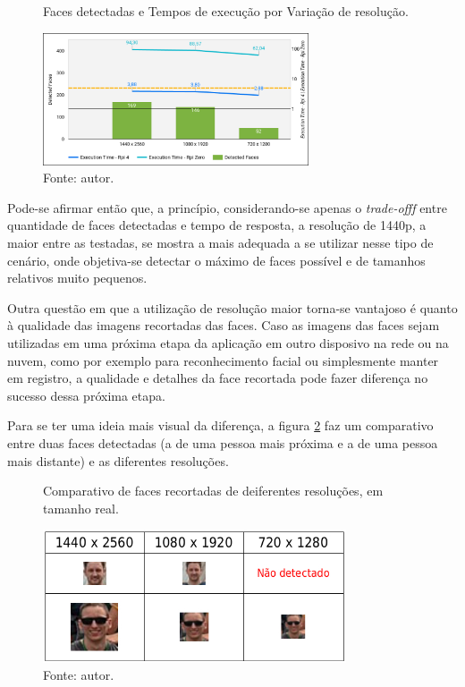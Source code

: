 \begin{figure}
    \centering
    \caption[Faces detectadas e Tempos de execução por Variação de resolução.]{Faces detectadas e Tempos de execução por Variação de resolução.}
    \includegraphics[width=0.7\textwidth]{Cap4_Experimentos_Realizados/Figures/cena1_graficos_variacao_resolucao.jpg}
    \caption*{Fonte: autor.}
    \label{fig:cena1_graficos_variacao_resolucao}
\end{figure}

Pode-se afirmar então que, a princípio, considerando-se apenas o \emph{trade-offf} entre quantidade de faces detectadas e tempo de resposta, a resolução de 1440p, a maior entre as  testadas, se mostra a mais adequada a se utilizar nesse tipo de cenário, onde objetiva-se detectar o máximo de faces possível e de tamanhos relativos muito pequenos.

Outra questão em que a utilização de resolução maior torna-se vantajoso é quanto à qualidade das imagens recortadas das faces. Caso as imagens das faces sejam utilizadas em uma próxima etapa da aplicação em outro disposivo na rede ou na nuvem, como por exemplo para reconhecimento facial ou simplesmente manter em registro, a qualidade e detalhes da face recortada pode fazer diferença no sucesso dessa próxima etapa.

Para se ter uma ideia mais visual da diferença, a figura \ref{fig:cena1_comparativo_qualidade_faces} faz um comparativo entre duas faces detectadas (a de uma pessoa mais próxima e a de uma pessoa mais distante) e as diferentes resoluções.

\begin{figure}
    \centering
    \caption[Comparativo de faces recortadas de deiferentes resoluções, em tamanho real.]{Comparativo de faces recortadas de deiferentes resoluções, em tamanho real.}
    \includegraphics[width=0.8\textwidth]{Cap4_Experimentos_Realizados/Figures/cena1_comparativo_qualidade_faces_recortadas.jpg}
    \caption*{Fonte: autor.}
    \label{fig:cena1_comparativo_qualidade_faces}
\end{figure}

